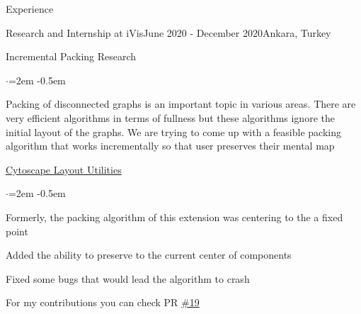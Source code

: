 \documentclass{resume} %
\begin{document}
\begin{rSection}{Experience}
\begin{rSubsection}{Research and Internship at iVis}{June 2020 - December 2020}{}{Ankara, Turkey}
\item Incremental Packing Research
\begin{list}{$\cdot$}{\leftmargin=2em}
\itemsep -0.5em \vspace{-0.5em} %
    \item Packing of disconnected graphs is an important topic in various areas. There are very efficient algorithms in terms of fullness but these algorithms ignore the initial layout of the graphs. We are trying to come up with a feasible packing algorithm that works incrementally so that user preserves their mental map
\end{list}
\item \href{https://github.com/iVis-at-Bilkent/cytoscape.js-layout-utilities}{Cytoscape Layout Utilities}
\begin{list}{$\cdot$}{\leftmargin=2em}
\itemsep -0.5em \vspace{-0.5em} %
    \item Formerly, the packing algorithm of this extension was centering to the a fixed point
    \item Added the ability to preserve to the current center of components
    \item Fixed some bugs that would lead the algorithm to crash
    \item For my contributions you can check PR \href{https://github.com/iVis-at-Bilkent/cytoscape.js-layout-utilities/pull/19}{\#19}
\end{list}
\end{rSubsection}

\end{rSection}
\end{document}
